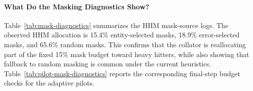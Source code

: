

\paragraph{What Do the Masking Diagnostics Show?}
Table~\ref{tab:mask-diagnostics} summarizes the HHM mask-source logs. The observed HHM allocation is 15.4\% entity-selected masks, 18.9\% error-selected masks, and 65.6\% random masks. This confirms that the collator is reallocating part of the fixed 15\% mask budget toward heavy hitters, while also showing that fallback to random masking is common under the current heuristics. Table~\ref{tab:pilot-mask-diagnostics} reports the corresponding final-step budget checks for the adaptive pilots.




